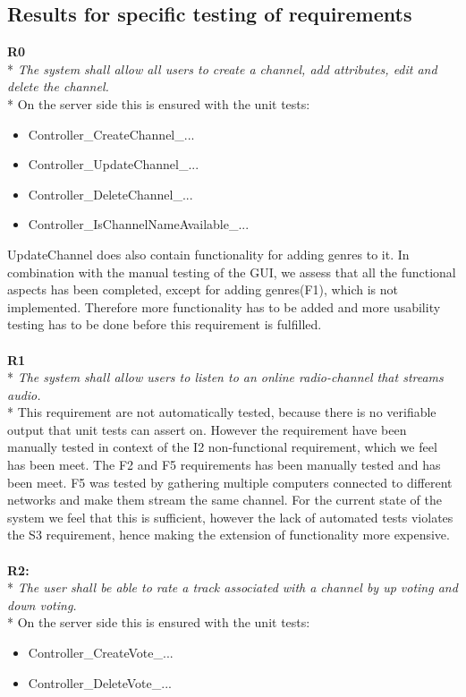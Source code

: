 \documentclass[a4paper,11pt,report]{article}
\begin{document}
\subsection{Results for specific testing of requirements}
\textbf{R0} \\*
\textit{The system shall allow all users to create a channel, add attributes, edit and delete the channel.} \\*
On the server side this is ensured with the unit tests:
\begin{itemize}
\item Controller\_CreateChannel\_...
\item Controller\_UpdateChannel\_...
\item Controller\_DeleteChannel\_...
\item Controller\_IsChannelNameAvailable\_...
\end{itemize}
UpdateChannel does also contain functionality for adding genres to it. In combination with the manual testing of the GUI, we assess that all the functional aspects has been completed, except for adding genres(F1), which is not implemented. Therefore more functionality has to be added and more usability testing has to be done before this requirement is fulfilled.\\ \\
\textbf{R1} \\*
\textit{The system shall allow users to listen to an online radio-channel that streams audio.} \\*
This requirement are not automatically tested, because there is no verifiable output that unit tests can assert on. However the requirement have been manually tested in context of the I2 non-functional requirement, which we feel has been meet. The F2 and F5 requirements has been manually tested and has been meet. F5 was tested by gathering multiple computers connected to different networks and make them stream the same channel. For the current state of the system we feel that this is sufficient, however the lack of automated tests violates the S3 requirement, hence making the extension of functionality more expensive. \\ \\
\textbf{R2:} \\*
\textit{The user shall be able to rate a track associated with a channel by up voting and down voting.} \\*
On the server side this is ensured with the unit tests:
\begin{itemize}
\item Controller\_CreateVote\_...
\item Controller\_DeleteVote\_...
\end{itemize}
\end{document}
